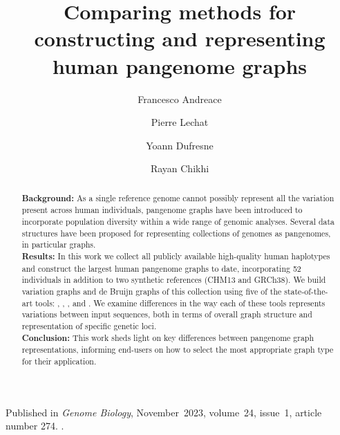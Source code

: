 \author
{
	Francesco Andreace
	\and
	Pierre Lechat
	\and
	Yoann Dufresne
	\and
	Rayan Chikhi
}
\title{Comparing methods for constructing and representing human pangenome graphs}

\metadata
{
	Published in \emph{Genome Biology},
	November~2023,
	volume~24,
	issue~1,
	article number 274.
	.
}
\maketitle
\label{pap:first}

\begin{abstract}
	\textbf{Background:} As a single reference genome cannot possibly represent all the variation present across human individuals, pangenome graphs have been introduced to incorporate population diversity within a wide range of genomic analyses. Several data structures have been proposed for representing collections of genomes as pangenomes, in particular graphs. \\
	\noindent \textbf{Results:} In this work we collect all publicly available high-quality human haplotypes and construct the largest human pangenome graphs to date, incorporating 52 individuals in addition to two synthetic references (CHM13 and GRCh38). We build variation graphs and de Bruijn graphs of this collection using five of the state-of-the-art tools: \bifrost, \mdbg, \minigraph, \mcactus and \pggb. We examine differences in the way each of these tools represents variations between input sequences, both in terms of overall graph structure and representation of specific genetic loci. \\
	\noindent \textbf{Conclusion:} This work sheds light on key differences between pangenome graph representations, informing end-users on how to select the most appropriate graph type for their application.
\end{abstract}


